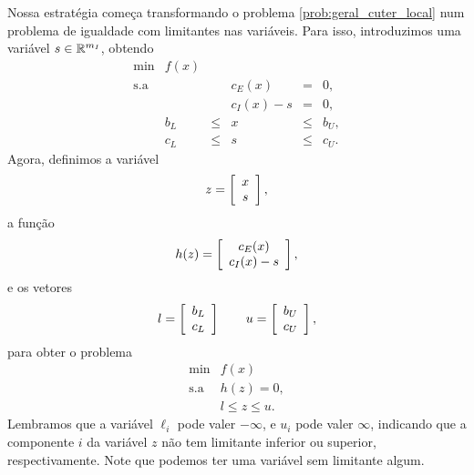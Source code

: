 Nossa estratégia começa transformando o problema \eqref{prob:geral_cuter_local}
num problema de igualdade com limitantes nas variáveis. Para isso, introduzimos
uma variável $s\in\mathbb{R}^{m_I}$, obtendo
\begin{equation}\nonumber
\begin{array}{rrrcll}
\min       & f(x) \\
\mbox{s.a} & & & c_E(x) & = & 0, \\
           & & & c_I(x) - s & = & 0, \\
           & b_L & \leq & x & \leq & b_U, \\
           & c_L & \leq & s & \leq & c_U.
\end{array}
\end{equation}
Agora, definimos a variável
$$z = \left[\begin{array}{c}x \\ s\end{array}\right],$$
a função
$$h(z) = \left[\begin{array}{c}c_E(x) \\ c_I(x) - s\end{array}\right],$$
e os vetores
$$l = \left[\begin{array}{c}b_L \\ c_L\end{array}\right] \qquad u = \left[\begin{array}{c}b_U \\ c_U\end{array}\right],$$
para obter o problema
\begin{equation}\nonumber
\begin{array}{rl}
\min       & f(x) \\
\mbox{s.a} & h(z) = 0, \\
           & l \leq z \leq u.
\end{array}
\end{equation}
Lembramos que a variável $\ell_i$ pode valer $-\infty$, e $u_i$ pode valer
$\infty$, indicando que a componente $i$ da variável $z$ não tem limitante
inferior ou superior, respectivamente. Note que podemos ter uma variável sem
limitante algum.

